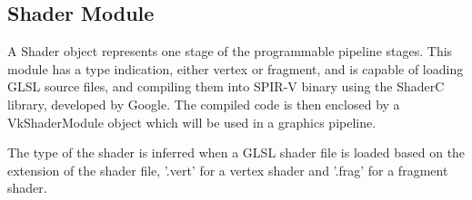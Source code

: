 \subsection{Shader Module}
A Shader object represents one stage of the programmable pipeline stages. This module has a type indication, either vertex or fragment, and is capable of loading GLSL source files, and compiling them into SPIR-V binary using the ShaderC library, developed by Google. The compiled code is then enclosed by a VkShaderModule object which will be used in a graphics pipeline.

The type of the shader is inferred when a GLSL shader file is loaded based on the extension of the shader file, '.vert' for a vertex shader and '.frag' for a fragment shader.
